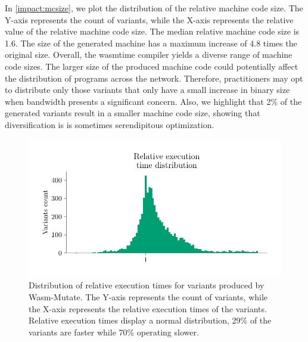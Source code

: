\documentclass[a4paper,fleqn]{cas-dc}
\newcommand{\tool}{{\sc Wasm-Mutate}\xspace}
\newcommand{\Wasm}{WebAssembly\xspace}
\newenvironment{revision1}{\color{blue}}{}
\begin{document}
\begin{revision1}
In \autoref{impact:mcsize}, we plot the distribution of the relative machine code size.
The Y-axis represents the count of variants, while the X-axis represents the relative value of the relative machine code size.
The median relative machine code size is 1.6.
The size of the generated machine has a maximum increase of 4.8 times the original size.
Overall, the wasmtime compiler yields a diverse range of machine code sizes.
The larger size of the produced machine code could potentially affect the distribution of programs across the network.
Therefore, practitioners may opt to distribute only those variants that only have a small increase in binary size when bandwidth presents a significant concern.
Also, we highlight that 2\% of the generated variants result in a smaller machine code size, showing that diversification is is sometimes serendipitous optimization.


\begin{figure}
    \centering
    \includegraphics[width=\linewidth]{plots/rq4/ext.pdf}
    \caption{Distribution of relative execution times for variants produced by \tool.
The Y-axis represents the count of variants, while the X-axis represents the relative execution times of the variants. Relative execution times display a normal distribution, 29\% of the variants are faster while 70\% operating slower. }
  \label{impact:time}
\end{figure}


\end{revision1}
\end{document}
